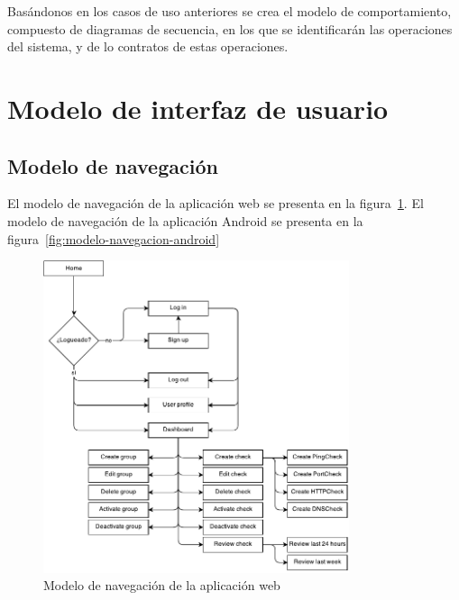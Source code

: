 Basándonos en los casos de uso anteriores se crea el modelo de comportamiento,
compuesto de diagramas de secuencia, en los que se identificarán las operaciones
del sistema, y de lo contratos de estas operaciones.

\section{Modelo de interfaz de usuario}

\subsection{Modelo de navegación}

El modelo de navegación de la aplicación web se presenta en la
figura~\ref{fig:modelo-navegacion-web}. El modelo de navegación de la aplicación
Android se presenta en la figura~\ref{fig:modelo-navegacion-android}

\begin{figure}[H]
  \centering
  \includegraphics[width=0.8\textwidth]{4_analisis/diagrama_navegacion}
  \caption{Modelo de navegación de la aplicación web}
  \label{fig:modelo-navegacion-web}
\end{figure}

